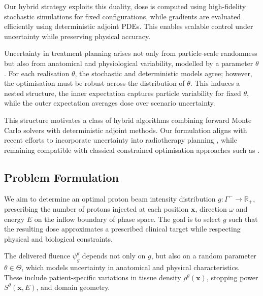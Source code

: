 \documentclass{amsart}
\theoremstyle{plain}
\renewcommand{\vec}[1]{\ensuremath{\boldsymbol{#1}}}
\begin{document}
Our hybrid strategy exploits this duality, dose is computed using
high-fidelity stochastic simulations for fixed configurations, while
gradients are evaluated efficiently using deterministic adjoint
PDEs. This enables scalable control under uncertainty while preserving
physical accuracy.

Uncertainty in treatment planning arises not only from particle-scale
randomness but also from anatomical and physiological variability,
modelled by a parameter $\theta$. For each realisation $\theta$, the
stochastic and deterministic models agree; however, the optimisation
must be robust across the distribution of $\theta$. This induces a
nested structure, the inner expectation captures particle variability
for fixed $\theta$, while the outer expectation averages dose over
scenario uncertainty.

This structure motivates a class of hybrid algorithms combining
forward Monte Carlo solvers with deterministic adjoint methods. Our
formulation aligns with recent efforts to incorporate uncertainty into
radiotherapy planning \cite{bangert2013analytical}, while remaining
compatible with classical constrained optimisation approaches such as
\cite{bortfeld1993optimization}.

\subsection{Problem Formulation}
\label{subsec:problem-formulation}

We aim to determine an optimal proton beam intensity distribution $g:
\Gamma^- \to \mathbb{R}_+$, prescribing the number of protons injected
at each position $\vec{x}$, direction $\omega$ and energy $E$ on the
inflow boundary of phase space. The goal is to select $g$ such that
the resulting dose approximates a prescribed clinical target while
respecting physical and biological constraints.

The delivered fluence $\psi_g^\theta$ depends not only on $g$, but
also on a random parameter $\theta \in \Theta$, which models
uncertainty in anatomical and physical characteristics. These include
patient-specific variations in tissue density $\rho^\theta(\vec{x})$,
stopping power $S^\theta(\vec{x}, E)$, and domain geometry.
\end{document}
